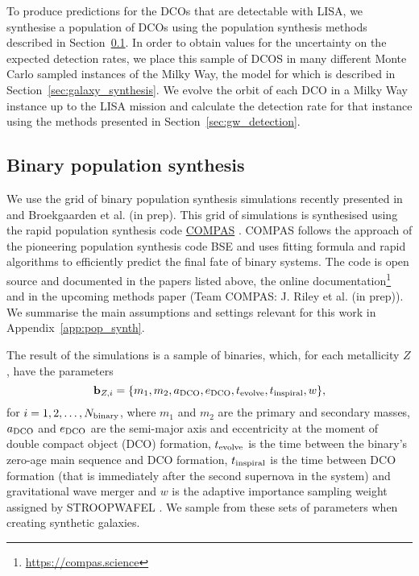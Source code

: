 To produce predictions for the DCOs that are detectable with LISA, we synthesise a population of DCOs using the population synthesis methods described in Section~\ref{sec:COMPAS_explained}. In order to obtain values for the uncertainty on the expected detection rates, we place this sample of DCOS in many different Monte Carlo sampled instances of the Milky Way, the model for which is described in Section~\ref{sec:galaxy_synthesis}. We evolve the orbit of each DCO in a Milky Way instance up to the LISA mission and calculate the detection rate for that instance using the methods presented in Section~\ref{sec:gw_detection}.

\subsection{Binary population synthesis}\label{sec:COMPAS_explained}

We use the grid of binary population synthesis simulations recently presented in \citet{Broekgaarden+2021} and Broekgaarden et al. (in prep). This grid of simulations is synthesised using the rapid population synthesis code \href{https://compas.science}{COMPAS} \citep{Stevenson+2017, Vigna-Gomez+2018, Stevenson+2019}. COMPAS follows the approach of the pioneering population synthesis code BSE \citep{Hurley+2000,Hurley+2002} and uses fitting formula and rapid algorithms to efficiently predict the final fate of binary systems. The code is open source and documented in the papers listed above, the online documentation\footnote{\url{https://compas.science}} and in the upcoming methods paper (Team COMPAS: J. Riley et al. (in prep)). We summarise the main assumptions and settings relevant for this work in Appendix~\ref{app:pop_synth}.

The result of the simulations is a sample of binaries, which, for each metallicity $Z$, have the parameters
\begin{equation}
    \mathbf{b}_{{Z, i}} = \{m_1, m_2, a_{\rm DCO}, e_{\rm DCO}, t_{\rm evolve}, t_{\rm inspiral}, w\},
\end{equation}
for $i = 1, 2, \dots, N_{\rm binary}$, where $m_1$ and $m_2$ are the primary and secondary masses, $a_{\rm DCO}$ and $e_{\rm DCO}$ are the semi-major axis and eccentricity at the moment of double compact object (DCO) formation, $t_{\rm evolve}$ is the time between the binary's zero-age main sequence and DCO formation, $t_{\rm inspiral}$ is the time between DCO formation (that is immediately after the second supernova in the system) and gravitational wave merger and $w$ is the adaptive importance sampling weight assigned by STROOPWAFEL \cite[][Eq.~7]{Broekgaarden+2019}. We sample from these sets of parameters when creating synthetic galaxies.

